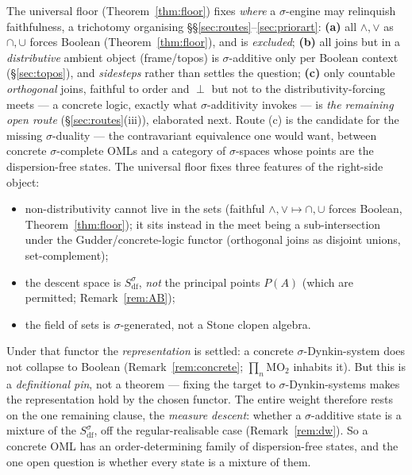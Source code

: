 \documentclass[11pt,reqno]{amsart}
\theoremstyle{plain}
\theoremstyle{definition}
\theoremstyle{remark}
\begin{document}
\noindent The universal floor (Theorem~\ref{thm:floor}) fixes \emph{where} a
$\sigma$-engine may relinquish faithfulness, a trichotomy organising
\S\S\ref{sec:routes}--\ref{sec:priorart}:
\textbf{(a)} all $\wedge,\vee$ as $\cap,\cup$ forces Boolean (Theorem~\ref{thm:floor}),
and is \emph{excluded};
\textbf{(b)} all joins but in a \emph{distributive} ambient object (frame/topos) is
$\sigma$-additive only per Boolean context (\S\ref{sec:topos}), and \emph{sidesteps}
rather than settles the question;
\textbf{(c)} only countable \emph{orthogonal} joins, faithful to order and $\perp$ but
not to the distributivity-forcing meets --- a concrete logic, exactly what
$\sigma$-additivity invokes --- is \emph{the remaining open route}
(\S\ref{sec:routes}(iii)), elaborated next.
Route (c) is the candidate for the missing $\sigma$-duality --- the contravariant
equivalence one would want, between concrete $\sigma$-complete OMLs and a category of
$\sigma$-spaces whose points are the dispersion-free states. The universal floor fixes
three features of the right-side object:
\begin{itemize}[noitemsep, topsep=2pt, leftmargin=1.5em]
  \item non-distributivity cannot live in the sets (faithful
    $\wedge,\vee\mapsto\cap,\cup$ forces Boolean, Theorem~\ref{thm:floor}); it sits
    instead in the meet being a sub-intersection under the Gudder/concrete-logic functor
    (orthogonal joins as disjoint unions, set-complement);
  \item the descent space is $S_{\mathrm{df}}^\sigma$, \emph{not} the principal points
    $P(A)$ (which are permitted; Remark~\ref{rem:AB});
  \item the field of sets is $\sigma$-generated, not a Stone clopen algebra.
\end{itemize}
Under that functor the \emph{representation} is settled: a concrete
$\sigma$-Dynkin-system does not collapse to Boolean (Remark~\ref{rem:concrete};
$\prod_n\mathrm{MO}_2$ inhabits it). But this is a \emph{definitional pin}, not a theorem
--- fixing the target to $\sigma$-Dynkin-systems makes the representation hold by the
chosen functor. The entire weight therefore rests on the one remaining clause, the
\emph{measure descent}: whether a $\sigma$-additive state is a mixture of the
$S_{\mathrm{df}}^\sigma$, off the regular-realisable case (Remark~\ref{rem:dw}). So a
concrete OML has an order-determining family of dispersion-free states, and the one open
question is whether every state is a mixture of them.
\end{document}
